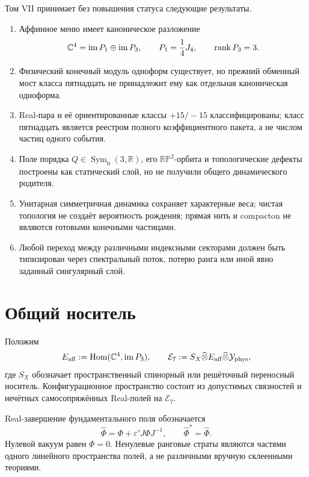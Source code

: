 Том VII принимает без повышения статуса следующие результаты.
\begin{enumerate}
 \item Аффинное меню имеет каноническое разложение
 \begin{equation}
  \mathbb C^4=\operatorname{im}P_1\oplus\operatorname{im}P_3,
  \qquad
  P_1=\frac14J_4,
  \qquad
  \operatorname{rank} P_3=3.
 \end{equation}
 \item Физический конечный модуль одноформ существует, но прежний
 обменный мост класса пятнадцать не принадлежит ему как отдельная
 каноническая одноформа.
 \item Real-пара и её ориентированные классы $+15/-15$ классифицированы;
 класс пятнадцать является реестром полного коэффициентного пакета, а не
 числом частиц одного события.
 \item Поле порядка $Q\in\operatorname{Sym}_0(3,\mathbb R)$, его
 $\mathbb{RP}^2$-орбита и топологические дефекты построены как статический
 слой, но не получили общего динамического родителя.
 \item Унитарная симметричная динамика сохраняет характерные веса; чистая
 топология не создаёт вероятность рождения; прямая нить и compacton не
 являются готовыми конечными частицами.
 \item Любой переход между различными индексными секторами должен быть
 типизирован через спектральный поток, потерю ранга или иной явно заданный
 сингулярный слой.
\end{enumerate}

\section{Общий носитель}

Положим
\begin{equation}
 E_{\rm aff}
 :=\operatorname{Hom}(\mathbb C^4,\operatorname{im}P_3),
 \qquad
 \mathcal E_7
 :=S_X\widehat\otimes E_{\rm aff}
 \widehat\otimes\mathcal Y_{\rm phys},
 \label{eq:v7-common-carrier}
\end{equation}
где $S_X$ обозначает пространственный спинорный или решёточный переносный
носитель. Конфигурационное пространство состоит из допустимых связностей и
нечётных самосопряжённых Real-полей на $\mathcal E_7$.

Real-завершение фундаментального поля обозначается
\begin{equation}
 \widehat\Phi
 =\Phi+\varepsilon'J\Phi J^{-1},
 \qquad
 \widehat\Phi^*=\widehat\Phi.
 \label{eq:v7-real-completion}
\end{equation}
Нулевой вакуум равен $\Phi=0$. Ненулевые ранговые страты являются частями
одного линейного пространства полей, а не различными вручную склеенными
теориями.

